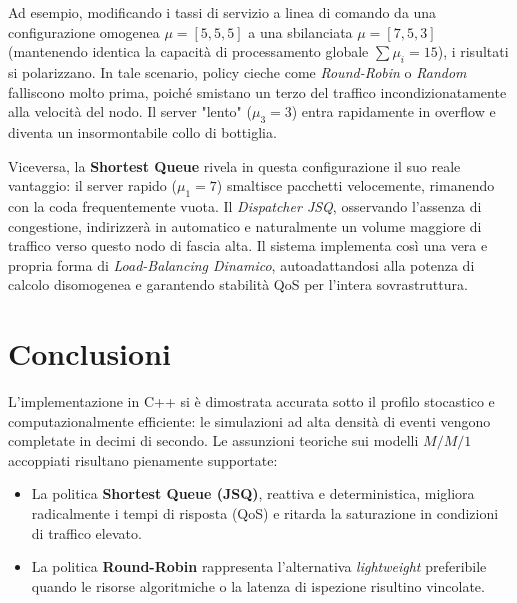 \documentclass[12pt,a4paper]{article}
\begin{document}
Ad esempio, modificando i tassi di servizio a linea di comando da una configurazione omogenea $\mu = [5, 5, 5]$ a una sbilanciata \textbf{$\mu = [7, 5, 3]$} (mantenendo identica la capacità di processamento globale $\sum \mu_i = 15$), i risultati si polarizzano.
In tale scenario, policy cieche come \textit{Round-Robin} o \textit{Random} falliscono molto prima, poiché smistano un terzo del traffico incondizionatamente alla velocità del nodo. Il server "lento" ($\mu_3=3$) entra rapidamente in overflow e diventa un insormontabile collo di bottiglia.

Viceversa, la \textbf{Shortest Queue} rivela in questa configurazione il suo reale vantaggio: il server rapido ($\mu_1=7$) smaltisce pacchetti velocemente, rimanendo con la coda frequentemente vuota. Il \textit{Dispatcher JSQ}, osservando l'assenza di congestione, indirizzerà in automatico e naturalmente un volume maggiore di traffico verso questo nodo di fascia alta. Il sistema implementa così una vera e propria forma di \textit{Load-Balancing Dinamico}, autoadattandosi alla potenza di calcolo disomogenea e garantendo stabilità QoS per l'intera sovrastruttura.

\section{Conclusioni}

L'implementazione in C++ si è dimostrata accurata sotto il profilo stocastico e computazionalmente efficiente: le simulazioni ad alta densità di eventi vengono completate in decimi di secondo. Le assunzioni teoriche sui modelli $M/M/1$ accoppiati risultano pienamente supportate:

\begin{itemize}
  \item La politica \textbf{Shortest Queue (JSQ)}, reattiva e deterministica, migliora radicalmente i tempi di risposta (QoS) e ritarda la saturazione in condizioni di traffico elevato.
  \item La politica \textbf{Round-Robin} rappresenta l'alternativa \textit{lightweight} preferibile quando le risorse algoritmiche o la latenza di ispezione risultino vincolate.
\end{itemize}
\end{document}
